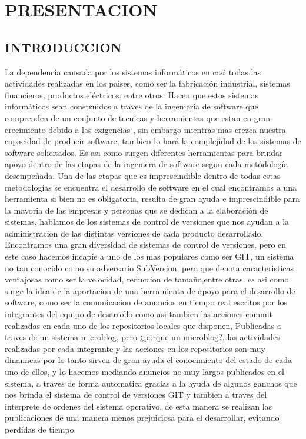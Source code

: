 

%
\chapter{PRESENTACION}
\section{INTRODUCCION}
La dependencia causada por los sistemas informáticos en casi todas las actividades realizadas en los paises, como ser la fabricación industrial, sistemas financieros, productos eléctricos, entre otros.
Hacen que estos sistemas informáticos sean construidos a traves de la ingenieria de software que comprenden de un conjunto de tecnicas y herramientas que estan en gran crecimiento debido a las exigencias , sin embargo mientras mas crezca nuestra capacidad de producir software, tambien lo hará la complejidad de los sistemas de software solicitados.
Es asi como surgen diferentes herramientas para brindar apoyo dentro de las etapas de la ingeniera de software segun cada metódología desempeñada. Una de las etapas que es imprescindible dentro de todas estas metodologías se encuentra el desarrollo de software en el cual encontramos a una herramienta si bien no es obligatoria, resulta de gran ayuda e imprescindible para la mayoria de las empresas y personas que se dedican a la elaboración de sistemas, hablamos de los sistemas de control de versiones que nos ayudan a la administracion de las distintas versiones de cada producto desarrollado.
Encontramos una gran diversidad de sistemas de control de versiones, pero en este caso hacemos incapíe a uno de los mas populares como ser GIT, un sistema no tan conocido como su adversario SubVersion, pero que denota caracteristicas ventajosas como ser la velocidad, reduccion de tamaño,entre otras. es asi como surge la idea de la aportacion de una herramienta de apoyo para el desarrollo de software, como ser la comunicacion de anuncios en tiempo real escritos por los integrantes del equipo de desarrollo como asi tambien las acciones commit realizadas en cada uno de los repositorios locales que disponen, Publicadas a traves de un sistema microblog, pero ¿porque un microblog?. las actividades realizadas por cada integrante y las acciones en los repositorios son muy dinamicas por lo tanto sirven de gran ayuda el conocimiento del estado de cada uno de ellos, y lo hacemos mediando anuncios no muy largos publicados en el sistema, a traves de forma automatica gracias a la ayuda de algunos ganchos que nos brinda el sistema de control de versiones GIT y tambien a traves del interprete de ordenes del sistema operativo, de esta manera se realizan las publicaciones de una manera menos prejuiciosa para el desarrollar, evitando perdidas de tiempo.
